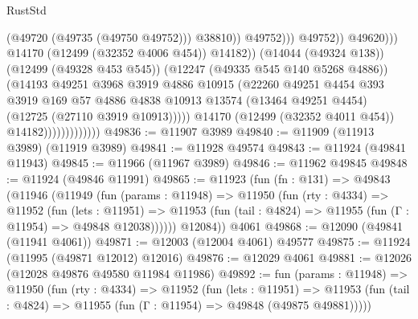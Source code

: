 \begin{lexlean}{RustStd}
\begin{coremodule}
{\begin{coremodule}
{{{{{{{{{{{{{{{{{{{{{{{{{{{{{{{{{{{{{{{{{{{{{{{{{{{{{{{{{{{{{{{{{{{{{{{{{{{{{{{{                                                        (@49720 (@49735 (@49750 @49752)))
                                                        @38810))
                                                    @49752)))
                                              @49752))
                                          @49620)))
                                    @14170
                                    (@12499 (@32352 @4006 @454))
                                    @14182))
                                (@14044 (@49324 @138))
                                (@12499 (@49328 @453 @545))
                                (@12247 (@49335 @545 @140 @5268 @4886))
                                (@14193
                                  @49251
                                  @3968
                                  @3919
                                  @4886
                                  @10915
                                  (@22260
                                    @49251
                                    @4454
                                    @393
                                    @3919
                                    @169
                                    @57
                                    @4886
                                    @4838
                                    @10913
                                    @13574
                                    (@13464 @49251 @4454)
                                    (@12725 (@27110 @3919 @10913)))))
                              @14170
                              (@12499 (@32352 @4011 @454))
                              @14182)))))))))))))
@49836 := @11907 @3989
@49840 := @11909 (@11913 @3989) (@11919 @3989)
@49841 := @11928 @49574
@49843 := @11924 (@49841 @11943)
@49845 := @11966 (@11967 @3989)
@49846 := @11962 @49845
@49848 := @11924 (@49846 @11991)
@49865 := @11923
    (fun (fn : @131) =>
    @49843
      (@11946
        (@11949
          (fun (params : @11948) =>
          @11950
            (fun (rty : @4334) =>
            @11952
              (fun (lets : @11951) =>
              @11953 (fun (tail : @4824) => @11955 (fun (Γ : @11954) => @49848 @12038))))))
        @12084))
    @4061
@49868 := @12090 (@49841 (@11941 @4061))
@49871 := @12003 (@12004 @4061) @49577
@49875 := @11924 (@11995 (@49871 @12012) @12016)
@49876 := @12029 @4061
@49881 := @12026 (@12028 @49876 @49580 @11984 @11986)
@49892 := fun (params : @11948) =>
  @11950
    (fun (rty : @4334) =>
    @11952
      (fun (lets : @11951) =>
      @11953 (fun (tail : @4824) => @11955 (fun (Γ : @11954) => @49848 (@49875 @49881)))))
}}}}}}}}}}}}}}}}}}}}}}}}}}}}}}}}}}}}}}}}}}}}}}}}}}}}}}}}}}}}}}}}}}}}}}}}}}}}}}}}
\end{coremodule}}
\end{coremodule}
\end{lexlean}
